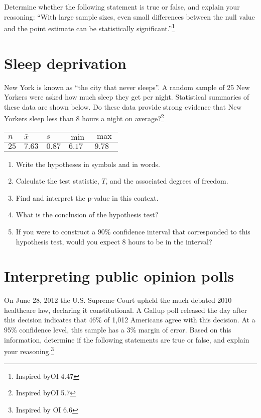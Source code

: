 \documentclass[
]{article}
\begin{document}
Determine whether the following statement is true or false, and explain
your reasoning: ``With large sample sizes, even small differences
between the null value and the point estimate can be statistically
significant.''\footnote{Inspired byOI 4.47}

\section{Sleep deprivation}\label{sleep-deprivation}

New York is known as ``the city that never sleeps''. A random sample of
25 New Yorkers were asked how much sleep they get per night. Statistical
summaries of these data are shown below. Do these data provide strong
evidence that New Yorkers sleep less than 8 hours a night on
average?\footnote{Inspired byOI 5.7}

\begin{longtable}[]{@{}lllll@{}}
\toprule\noalign{}
\(n\) & \(\bar{x}\) & \(s\) & \(\min\) & \(\max\) \\
\midrule\noalign{}
\endhead
\bottomrule\noalign{}
\endlastfoot
\(25\) & \(7.63\) & \(0.87\) & \(6.17\) & \(9.78\) \\
\end{longtable}

\begin{enumerate}
\def\labelenumi{\alph{enumi}.}
\item
  Write the hypotheses in symbols and in words.
\item
  Calculate the test statistic, \(T\), and the associated degrees of
  freedom.
\item
  Find and interpret the p-value in this context.
\item
  What is the conclusion of the hypothesis test?
\item
  If you were to construct a 90\% confidence interval that corresponded
  to this hypothesis test, would you expect 8 hours to be in the
  interval?
\end{enumerate}

\section{Interpreting public opinion
polls}\label{interpreting-public-opinion-polls}

On June 28, 2012 the U.S. Supreme Court upheld the much debated 2010
healthcare law, declaring it constitutional. A Gallup poll released the
day after this decision indicates that 46\% of 1,012 Americans agree
with this decision. At a 95\% confidence level, this sample has a 3\%
margin of error. Based on this information, determine if the following
statements are true or false, and explain your reasoning.\footnote{Inspired
  by OI 6.6}
\end{document}
